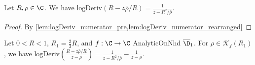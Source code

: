 \begin{lemma}\label{lem:logDeriv_numerator} 
\leanok
Let $R, \rho \in \C$. We have $\text{logDeriv}(R-z\bar\rho/R) = \frac{1}{z-R^2/\bar\rho}$.
\end{lemma}
\begin{proof}
\leanok
{}
By \cref{lem:logDeriv_numerator_pre,lem:logDeriv_numerator_rearranged}
\end{proof}



\begin{lemma}\label{lem:logDeriv_Blaschke_is_diff_frac} 
\leanok
Let $0<R<1$, $R_1=\frac{2}{3}R$, and $f:\C\to\C$ AnalyticOnNhd $\overline{\D}_1$. For $\rho \in \mathcal{K}_f(R_1)$, we have $\text{logDeriv}\left(\frac{R-z\bar\rho/R}{z-\rho}\right) = \frac{1}{z-R^2/\bar\rho} - \frac{1}{z-\rho}$.
\end{lemma}
